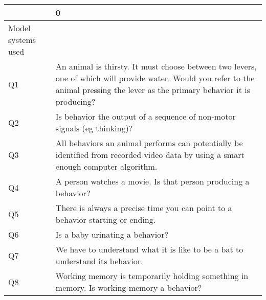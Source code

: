 \begin{tabular}{ll}
\toprule
{} &                                                                                                                                                                                                          0 \\
\midrule
                                                      Model systems used \\
Q1                    &                        An animal is thirsty. It must choose between two levers, one of which will provide water. Would you refer to the animal pressing the lever as the primary behavior it is producing? \\
Q2                    &                                                                                                                                   Is behavior the output of a sequence of non-motor signals (eg thinking)? \\
Q3                    &                                                                        All behaviors an animal performs can potentially be identified from recorded video data by using a smart enough computer algorithm. \\
Q4                    &                                                                                                                                             A person watches a movie. Is that person producing a behavior? \\
Q5                    &                                                                                                                             There is always a precise time you can point to a behavior starting or ending. \\
Q6                    &                                                                                                                                                                            Is a baby urinating a behavior? \\
Q7                    &                                                                                                                              We have to understand what it is like to be a bat to understand its behavior. \\
Q8                    &                                                                                                                   Working memory is temporarily holding something in memory. Is working memory a behavior? \\

\end{tabular}
